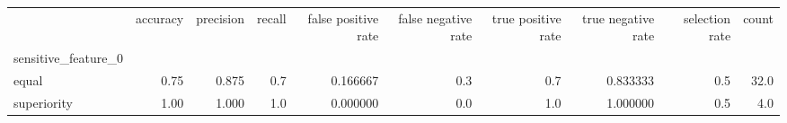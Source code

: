 \begin{tabular}{lrrrrrrrrr}
\toprule
{} &  accuracy &  precision &  recall &  false positive rate &  false negative rate &  true positive rate &  true negative rate &  selection rate &  count \\
sensitive\_feature\_0 &           &            &         &                      &                      &                     &                     &                 &        \\
\midrule
equal               &      0.75 &      0.875 &     0.7 &             0.166667 &                  0.3 &                 0.7 &            0.833333 &             0.5 &   32.0 \\
superiority         &      1.00 &      1.000 &     1.0 &             0.000000 &                  0.0 &                 1.0 &            1.000000 &             0.5 &    4.0 \\
\bottomrule
\end{tabular}
